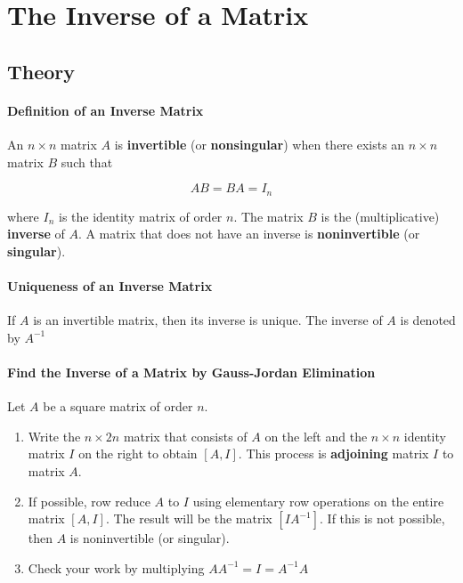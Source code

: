 \documentclass{report}
\begin{document}
\section{The Inverse of a Matrix}

\subsection{Theory}

\paragraph{Definition of an Inverse Matrix} An $n \times n$ matrix $A$ is \textbf{invertible} (or \textbf{nonsingular}) when there exists an $n \times n$ matrix $B$ such that

$$
AB = BA = I_n
$$

\noindent where $I_n$ is the identity matrix of order $n$. The matrix $B$ is the (multiplicative) \textbf{inverse} of $A$. A matrix that does not have an inverse is \textbf{noninvertible} (or \textbf{singular}).

\paragraph{Uniqueness of an Inverse Matrix}

If $A$ is an invertible matrix, then its inverse is unique. The inverse of $A$ is denoted by $A^{-1}$

\paragraph{Find the Inverse of a Matrix by Gauss-Jordan Elimination}

Let $A$ be a square matrix of order $n$.

\begin{enumerate}
    \item Write the $n \times 2n$ matrix that consists of $A$ on the left and the $n \times n$ identity matrix $I$ on the right to obtain $\left[A,I\right]$. This process is \textbf{adjoining} matrix $I$ to matrix $A$.

    \item If possible, row reduce $A$ to $I$ using elementary row operations on the entire matrix $[A,I]$. The result will be the matrix $[I A^{-1}]$. If this is not possible, then $A$ is noninvertible (or singular).

    \item Check your work by multiplying $A A^{-1} = I = A^{-1}A$

\end{enumerate}
\end{document}
